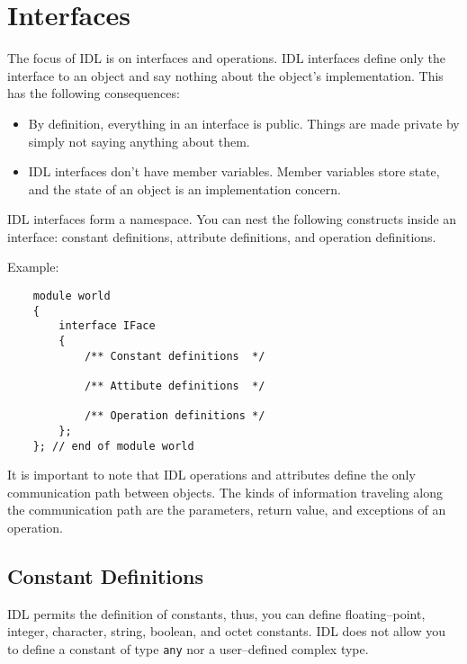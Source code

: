 \section{Interfaces}

The focus of IDL is on interfaces and operations. 
IDL interfaces define only the interface to an object and say nothing about the
object's implementation. This has the following consequences:
\begin{itemize}
\item By definition, everything in an interface is public. 
Things are made private by simply not saying anything about them.

\item IDL interfaces don't have member variables.
Member variables store state, and the state of an object is an implementation
concern.
\end{itemize}

IDL interfaces form a namespace. You can nest the following constructs inside 
an interface: constant definitions, attribute definitions, and operation definitions.

\newpage
Example:
\begin{verbatim}
    module world
    {
        interface IFace
        {
            /** Constant definitions  */
        
            /** Attibute definitions  */
        
            /** Operation definitions */
        };
    }; // end of module world
\end{verbatim}

It is important to note that IDL operations and attributes define the only 
communication path between objects.
The kinds of information traveling along the communication path are the
parameters, return value, and exceptions of an operation.


\subsection{Constant Definitions}

IDL permits the definition of constants, thus, you can define floating--point,
integer, character, string, boolean, and octet constants.
IDL does not allow you to define a constant of type {\tt any} nor a user--defined 
complex type.

